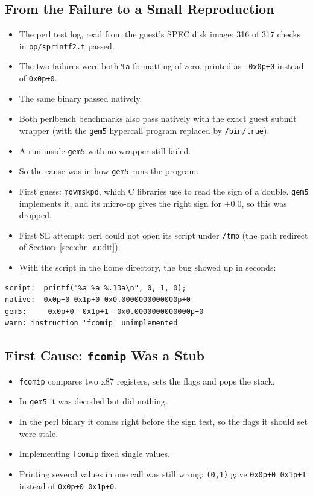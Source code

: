 \subsection{From the Failure to a Small Reproduction}
\begin{itemize}
    \item The perl test log, read from the guest's SPEC disk image: 316 of 317 checks in \texttt{op/sprintf2.t} passed.
    \item The two failures were both \texttt{\%a} formatting of zero, printed as \texttt{-0x0p+0} instead of \texttt{0x0p+0}.
    \item The same binary passed natively.
    \item Both perlbench benchmarks also pass natively with the exact guest submit wrapper (with the \texttt{gem5} hypercall program replaced by \texttt{/bin/true}).
    \item A run inside \texttt{gem5} with no wrapper still failed.
    \item So the cause was in how \texttt{gem5} runs the program.
\end{itemize}

\begin{itemize}
    \item First guess: \texttt{movmskpd}, which C libraries use to read the sign of a double. \texttt{gem5} implements it, and its micro-op gives the right sign for $+0.0$, so this was dropped.
    \item First SE attempt: perl could not open its script under \texttt{/tmp} (the path redirect of Section~\ref{sec:chr_audit}).
    \item With the script in the home directory, the bug showed up in seconds:
\end{itemize}
\begin{lstlisting}
script:  printf("%a %a %.13a\n", 0, 1, 0);
native:  0x0p+0 0x1p+0 0x0.0000000000000p+0
gem5:    -0x0p+0 -0x1p+1 -0x0.0000000000000p+0
warn: instruction 'fcomip' unimplemented
\end{lstlisting}

\subsection{First Cause: \texttt{fcomip} Was a Stub}
\begin{itemize}
    \item \texttt{fcomip} compares two x87 registers, sets the flags and pops the stack.
    \item In \texttt{gem5} it was decoded but did nothing.
    \item In the perl binary it comes right before the sign test, so the flags it should set were stale.
    \item Implementing \texttt{fcomip} fixed single values.
    \item Printing several values in one call was still wrong: \texttt{(0,1)} gave \texttt{0x0p+0 0x1p+1} instead of \texttt{0x0p+0 0x1p+0}.
\end{itemize}

